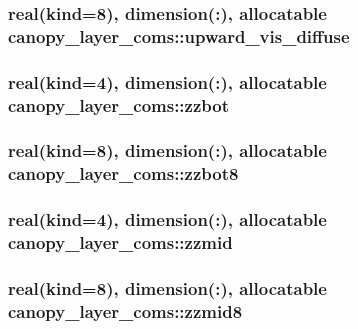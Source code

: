 \subsubsection[{upward\+\_\+vis\+\_\+diffuse}]{\setlength{\rightskip}{0pt plus 5cm}real(kind=8), dimension(\+:), allocatable canopy\+\_\+layer\+\_\+coms\+::upward\+\_\+vis\+\_\+diffuse}\label{namespacecanopy__layer__coms_a8c51c8b265b6e659631e5012541c8479}
\hypertarget{namespacecanopy__layer__coms_a4c8b994b7f3ea4ea983425f467310308}{}
\subsubsection[{zzbot}]{\setlength{\rightskip}{0pt plus 5cm}real(kind=4), dimension(\+:), allocatable canopy\+\_\+layer\+\_\+coms\+::zzbot}\label{namespacecanopy__layer__coms_a4c8b994b7f3ea4ea983425f467310308}
\hypertarget{namespacecanopy__layer__coms_a7719283fbd377164b1912aaa64947f55}{}
\subsubsection[{zzbot8}]{\setlength{\rightskip}{0pt plus 5cm}real(kind=8), dimension(\+:), allocatable canopy\+\_\+layer\+\_\+coms\+::zzbot8}\label{namespacecanopy__layer__coms_a7719283fbd377164b1912aaa64947f55}
\hypertarget{namespacecanopy__layer__coms_a708651b13f83ca19034c43fe5fef514f}{}
\subsubsection[{zzmid}]{\setlength{\rightskip}{0pt plus 5cm}real(kind=4), dimension(\+:), allocatable canopy\+\_\+layer\+\_\+coms\+::zzmid}\label{namespacecanopy__layer__coms_a708651b13f83ca19034c43fe5fef514f}
\hypertarget{namespacecanopy__layer__coms_a129061ed5b13a9746851e47fb6761d34}{}
\subsubsection[{zzmid8}]{\setlength{\rightskip}{0pt plus 5cm}real(kind=8), dimension(\+:), allocatable canopy\+\_\+layer\+\_\+coms\+::zzmid8}\label{namespacecanopy__layer__coms_a129061ed5b13a9746851e47fb6761d34}
\hypertarget{namespacecanopy__layer__coms_a93344c1b6866094b12e1eb38e47b5f1e}{}
